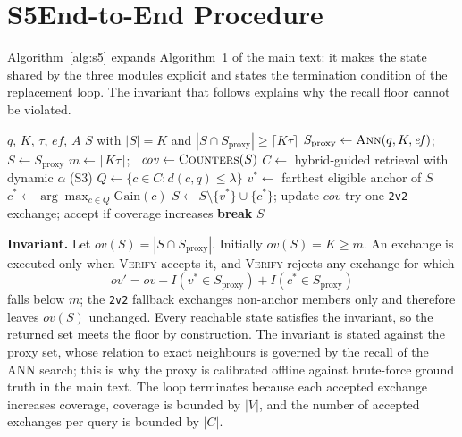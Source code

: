\documentclass[conference]{IEEEtran}
\begin{document}
\section*{S5\quad End-to-End Procedure}
\label{sec:s5}

Algorithm~\ref{alg:s5} expands Algorithm~1 of the main text: it makes the state
shared by the three modules explicit and states the termination condition of the
replacement loop. The invariant that follows explains why the recall floor
cannot be violated.
\algrenewcommand{}
\begin{algorithm*}[t]
\caption{Recall-constrained influence-aware retrieval (expanded)}
\label{alg:s5}
\begin{algorithmic}[1]
\Require $q$, $K$, $\tau$, $\mathit{ef}$, $A$
\Ensure $S$ with $|S|=K$ and $|S\cap S_{\text{proxy}}|\ge\lceil K\tau\rceil$
\State $S_{\text{proxy}}\leftarrow\textsc{Ann}(q,K,\mathit{ef})$; \ $S\leftarrow S_{\text{proxy}}$
\State $m\leftarrow\lceil K\tau\rceil$; \ $\mathit{cov}\leftarrow\textsc{Counters}(S)$
\State $C\leftarrow$ hybrid-guided retrieval with dynamic $\alpha$ (S3)
\State $Q\leftarrow\{c\in C: d(c,q)\le\lambda\}$
\Repeat
  \State $v^\ast\leftarrow$ farthest eligible anchor of $S$
  \State $c^\ast\leftarrow\arg\max_{c\in Q}\text{Gain}(c)$
     \State $S\leftarrow S\setminus\{v^\ast\}\cup\{c^\ast\}$; update $\mathit{cov}$
     \State try one \texttt{2v2} exchange; accept if coverage increases
  \Else
     \State \textbf{break}
  \EndIf
{}
\Return $S$
\end{algorithmic}
\end{algorithm*}

\textbf{Invariant.} Let $\mathit{ov}(S)=|S\cap S_{\text{proxy}}|$. Initially
$\mathit{ov}(S)=K\ge m$. An exchange is executed only when \textsc{Verify}
accepts it, and \textsc{Verify} rejects any exchange for which
\begin{equation}
\mathit{ov}'=\mathit{ov}-I(v^\ast\in S_{\text{proxy}})+I(c^\ast\in S_{\text{proxy}})
\end{equation}
falls below $m$; the \texttt{2v2} fallback exchanges non-anchor members only and
therefore leaves $\mathit{ov}(S)$ unchanged. Every reachable state satisfies the
invariant, so the returned set meets the floor by construction. The invariant is
stated against the proxy set, whose relation to exact neighbours is governed by
the recall of the ANN search; this is why the proxy is calibrated offline
against brute-force ground truth in the main text. The loop terminates because
each accepted exchange increases coverage, coverage is bounded by $|V|$, and the
number of accepted exchanges per query is bounded by $|C|$.
\end{document}
